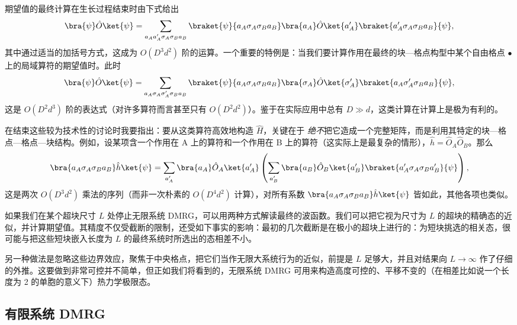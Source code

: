 期望值的最终计算在生长过程结束时由下式给出
\begin{equation}
\bra{\psi} \hat{O} \ket{\psi} = \sum_{a_A a'_A \sigma_A \sigma_B a_B} \braket{\psi}{a_A \sigma_A \sigma_B a_B} \bra{a_A} \hat{O} \ket{a'_A} \braket{a'_A \sigma_A \sigma_B a_B}{\psi},
\end{equation}
其中通过适当的加括号方式，这成为 $O(D^3 d^2)$ 阶的运算。一个重要的特例是：当我们要计算作用在最终的块—格点构型中某个自由格点 $\bullet$ 上的局域算符的期望值时。此时
\begin{equation}
\bra{\psi} \hat{O} \ket{\psi} = \sum_{a_A \sigma_A \sigma'_A \sigma_B a_B} \braket{\psi}{a_A \sigma_A \sigma_B a_B} \bra{\sigma_A} \hat{O} \ket{\sigma'_A} \braket{a_A \sigma'_A \sigma_B a_B}{\psi},
\end{equation}
这是 $O(D^2 d^3)$ 阶的表达式（对许多算符而言甚至只有 $O(D^2 d^2)$）。鉴于在实际应用中总有 $D \gg d$，这类计算在计算上是极为有利的。

在结束这些较为技术性的讨论时我要指出：要从这类算符高效地构造 $\hat{H}$，关键在于 {\em 绝不}把它造成一个完整矩阵，而是利用其特定的块—格点—格点—块结构。例如，设某项含一个作用在 A 上的算符和一个作用在 B 上的算符（这实际上是最复杂的情形），$\hat{h}=\hat{O}_A \hat{O}_B$。那么
\begin{equation}
\bra{a_A \sigma_A \sigma_B a_B} \hat{h}\ket{\psi} = \sum_{a'_A}
\bra{a_A}\hat{O}_A\ket{a'_A} \left( \sum_{a'_B} \bra{a_B}\hat{O}_B\ket{a'_B}  \braket{a'_A \sigma_A \sigma_B a'_B}{\psi} \right),
\label{eq:hamfragment}
\end{equation}
这是两次 $O(D^3 d^2)$ 乘法的序列（而非一次朴素的 $O( D^4 d^2)$ 计算），对所有系数 $\bra{a_A \sigma_A \sigma_B a_B} \hat{h}\ket{\psi}$ 皆如此，其他各项也类似。

如果我们在某个超块尺寸 $L$ 处停止无限系统 DMRG，可以用两种方式解读最终的波函数。我们可以把它视为尺寸为 $L$ 的超块的精确态的近似，并计算期望值。其精度不仅受截断的限制，还受如下事实的影响：最初的几次截断是在极小的超块上进行的：为短块挑选的相关态，很可能与把这些短块嵌入长度为 $L$ 的最终系统时所选出的态相差不小。

另一种做法是忽略这些边界效应，聚焦于中央格点，把它们当作无限大系统行为的近似，前提是 $L$ 足够大，并且对结果向 $L\rightarrow\infty$ 作了仔细的外推。这要做到非常可控并不简单，但正如我们将看到的，无限系统 DMRG 可用来构造高度可控的、平移不变的（在相差比如说一个长度为 2 的单胞的意义下）热力学极限态。

\subsection{有限系统 DMRG}

